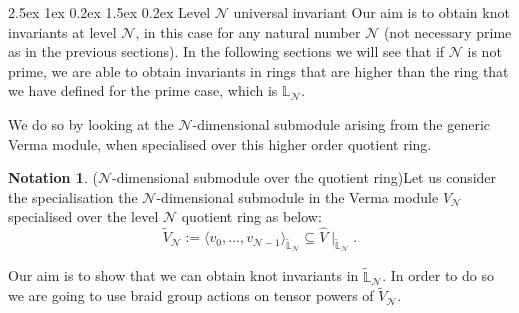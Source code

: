 \documentclass[reqno,a4paper,11pt]{amsart}
\makeatletter
\numberwithin{equation}{section}
\numberwithin{figure}{section}
\theoremstyle{definition}
\newtheorem{notation}[defn]{Notation}
\theoremstyle{plain}
\renewcommand*{\section}{\@startsection{section}{1}{\z@}%
	{2.5ex \@plus 1ex \@minus 0.2ex}%
	{1.5ex \@plus 0.2ex}%
	{\normalfont\normalsize\bfseries}}
\newcommand{\Li}{{\mathbb L}}
\newcommand{\cN}{\mathcal{N}}
\makeatother
\begin{document}
\section{Level $\cN$ universal invariant}
%
Our aim is to obtain knot invariants at level $\cN$, in this case for any natural number $\cN$ (not necessary prime as in the previous sections). In the following sections we will see that if $\cN$ is not prime, we are able to obtain invariants in rings that are higher than the ring that we have defined for the prime case, which is $\Li_{\cN}$. 
\par
We do so by looking at the $\cN$-dimensional submodule arising from the generic Verma module, when specialised over this higher order quotient ring.
\begin{notation}($\cN$-dimensional submodule over the quotient ring)\label{mod2}
Let us consider the specialisation the $\cN$-dimensional submodule in the Verma module $V_{\cN}$ specialised over the level $\cN$ quotient ring as below: 
 $$\widetilde{V}_{\cN}:=\langle v_{0},...,v_{\cN-1}\rangle_{\widetilde{\Li}_{\cN}} \subseteq \hat{V}\mid_{\widetilde{\Li}_{\cN}}.$$
\end{notation}
%
Our aim is to show that we can obtain knot invariants in $\widetilde{\Li}_{\cN}$. In order to do so we are going to use braid group actions on tensor powers of $\widetilde{V}_{\cN}$. 
%
\end{document}
